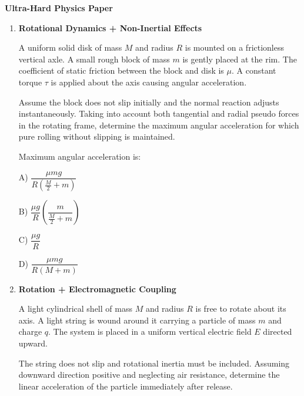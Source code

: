 \documentclass[12pt]{article}
\begin{document}
\begin{center}
\Large \textbf{Ultra-Hard Physics Paper}
\end{center}

\begin{enumerate}

\item \textbf{Rotational Dynamics + Non-Inertial Effects} 

A uniform solid disk of mass $M$ and radius $R$ is mounted on a frictionless vertical axle. A small rough block of mass $m$ is gently placed at the rim. The coefficient of static friction between the block and disk is $\mu$. A constant torque $\tau$ is applied about the axis causing angular acceleration.

Assume the block does not slip initially and the normal reaction adjusts instantaneously. Taking into account both tangential and radial pseudo forces in the rotating frame, determine the maximum angular acceleration for which pure rolling without slipping is maintained.

Maximum angular acceleration is:

\begin{center}
\end{center}

A) $ \dfrac{\mu mg}{R\left(\frac{M}{2}+m\right)} $

B) $ \dfrac{\mu g}{R}\left(\dfrac{m}{\frac{M}{2}+m}\right) $

C) $ \dfrac{\mu g}{R} $

D) $ \dfrac{\mu mg}{R(M+m)} $
\item \textbf{Rotation + Electromagnetic Coupling}

A light cylindrical shell of mass $M$ and radius $R$ is free to rotate about its axis. A light string is wound around it carrying a particle of mass $m$ and charge $q$. The system is placed in a uniform vertical electric field $E$ directed upward.

The string does not slip and rotational inertia must be included. Assuming downward direction positive and neglecting air resistance, determine the linear acceleration of the particle immediately after release.


\end{enumerate}
\end{document}
